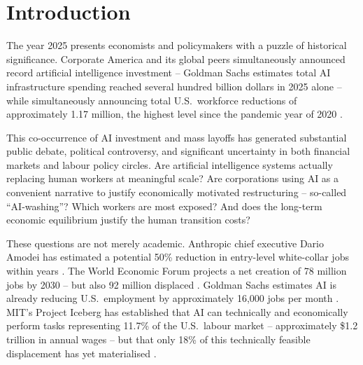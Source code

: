\documentclass[12pt, a4paper]{article}
\begin{document}
\newpage
\tableofcontents
\newpage

\section{Introduction}

The year 2025 presents economists and policymakers with a puzzle of historical significance.
Corporate America and its global peers simultaneously announced record artificial intelligence
investment -- Goldman Sachs estimates total AI infrastructure spending reached several hundred
billion dollars in 2025 alone \citep{goldmansachs2025} -- while simultaneously announcing
total U.S.\ workforce reductions of approximately 1.17 million, the highest level since
the pandemic year of 2020 \citep{challenger2025}.

This co-occurrence of AI investment and mass layoffs has generated substantial public debate,
political controversy, and significant uncertainty in both financial markets and labour policy
circles. Are artificial intelligence systems actually replacing human workers at meaningful
scale? Are corporations using AI as a convenient narrative to justify economically motivated
restructuring -- so-called ``AI-washing''? Which workers are most exposed? And does the
long-term economic equilibrium justify the human transition costs?

These questions are not merely academic. Anthropic chief executive Dario Amodei has estimated
a potential 50\% reduction in entry-level white-collar jobs within years
\citep{anthropic2026}. The World Economic Forum projects a net creation of 78 million jobs
by 2030 -- but also 92 million displaced \citep{wef2025}. Goldman Sachs estimates AI is
already reducing U.S.\ employment by approximately 16,000 jobs per month
\citep{goldmansachs2025}. MIT's Project Iceberg has established that AI can technically and
economically perform tasks representing 11.7\% of the U.S.\ labour market -- approximately
\$1.2 trillion in annual wages -- but that only 18\% of this technically feasible
displacement has yet materialised \citep{mit2025}.
\end{document}
